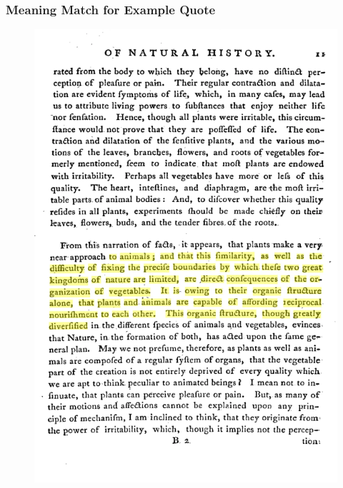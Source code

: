 \documentclass[pdf]{beamer}
\begin{document}
\begin{frame}
  \frametitle{Meaning Match for Example Quote}
    \begin{figure}[htbp]
      \centering
      \includegraphics[width=\linewidth,height=\textheight,keepaspectratio]{images/meaning_match.png}
    \end{figure}
\end{frame}
\end{document}
